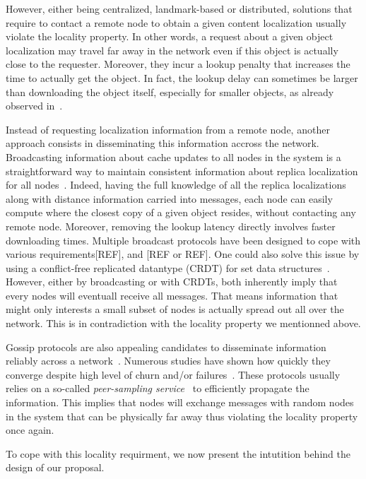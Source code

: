 However, either being centralized, landmark-based or distributed, solutions that require to contact a remote node to obtain a given content localization usually violate the locality property. In other words, a request about a given object localization may travel far away in the network even if this object is actually close to the requester.
Moreover, they incur a lookup penalty that increases the time to actually get the object. In fact, the lookup delay can sometimes be larger than downloading the object itself, especially for smaller objects, as already observed in~\cite{confais2017performance}.

Instead of requesting localization information from a remote node, another approach consists in disseminating this information accross the network.
Broadcasting information about cache updates to all nodes in the system is a straightforward way to maintain consistent information about replica localization for all nodes~\cite{nlsr,lscr}. Indeed, having the full knowledge of all the replica localizations along with distance information carried into messages, each node can easily compute where the closest copy of a given object resides, without contacting any remote node. Moreover, removing the lookup latency directly involves faster downloading times. 
Multiple broadcast protocols have been designed to cope with various requirements[REF], and [REF or REF].
One could also solve this issue by using a conflict-free replicated datantype (CRDT) for set data structures~\cite{shapiro2011crdts}. 
However, either by broadcasting or with CRDTs, both inherently imply that every nodes will eventuall receive all messages. 
That means information that might only interests a small subset of nodes is actually spread out all over the network. This is in contradiction 
with the locality property we mentionned above.

Gossip protocols are also appealing candidates to disseminate information reliably across a network~\cite{epidemic-protocol}. Numerous studies have shown how quickly they converge despite high level of churn and/or failures~\cite{lpbcast}.
These protocols usually relies on a so-called \textit{peer-sampling service}~\cite{gossip-peer-sampling} to efficiently propagate the information. This implies that nodes will exchange messages with random nodes in the system that can be physically far away thus violating the locality property once again. 

To cope with this locality requirment, we now present the intutition behind the design of our proposal.

